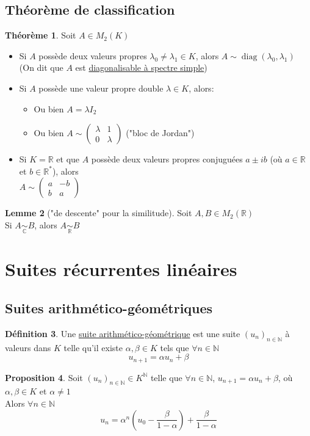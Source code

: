 \documentclass[10pt,a4paper]{article}
\theoremstyle{definition}
\newtheorem{proposition}{Proposition}[section]
\newtheorem{theorem}[proposition]{Théorème}
\newtheorem{lemme}[proposition]{Lemme}
\newtheorem{definition}[proposition]{Définition}
\DeclareMathOperator{\diag}{diag}
\begin{document}
\subsection{Théorème de classification}
\begin{theorem}
Soit $A \in M_2(K)$
\begin{itemize}
\item Si $A$ possède deux valeurs propres $\lambda_0 \neq \lambda_1 \in K$, alors $A \sim \diag(\lambda_0, \lambda_1)$ \\
(On dit que $A$ est \uline{diagonalisable à spectre simple})
\item Si $A$ possède une valeur propre double $\lambda \in K$, alors:
\begin{itemize}
\item Ou bien $A = \lambda I_2$
\item Ou bien $A \sim \begin{pmatrix}
\lambda & 1 \\
0 & \lambda
\end{pmatrix}$ ("bloc de Jordan")
\end{itemize}
\item Si $K = \mathbb{R}$ et que $A$ possède deux valeurs propres conjuguées $a \pm ib$ (où $a \in \mathbb{R}$ et $b \in \mathbb{R}^*$), alors \\
$A \sim \begin{pmatrix}
a & -b \\
b & a
\end{pmatrix}$
\end{itemize}
\end{theorem}
\begin{lemme}["de descente" pour la similitude]
Soit $A, B \in M_2(\mathbb{R})$ \\
Si $A \underset{\mathbb{C}}{\sim} B$, alors $A \underset{\mathbb{R}}{\sim} B$
\end{lemme}

\section{Suites récurrentes linéaires}
\subsection{Suites arithmético-géométriques}
\begin{definition}
Une \uline{suite arithmético-géométrique} est une suite $(u_n)_{n \in \mathbb{N}}$ à valeurs dans $K$ telle qu'il existe $\alpha, \beta \in K$ tels que $\forall n \in \mathbb{N}$
\[u_{n + 1} = \alpha u_n + \beta\]
\end{definition}
\begin{proposition}
Soit $(u_n)_{n \in \mathbb{N}} \in K^{\mathbb{N}}$ telle que $\forall n \in \mathbb{N}$, $u_{n + 1} = \alpha u_n + \beta$, où $\alpha, \beta \in K$ et $\alpha \neq 1$ \\
Alors $\forall n \in \mathbb{N}$
\[u_n = \alpha^n \left( u_0 - \frac{\beta}{1 - \alpha} \right) + \frac{\beta}{1 - \alpha}\]
\end{proposition}
\end{document}
